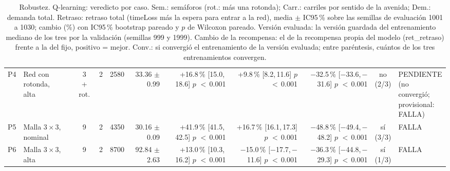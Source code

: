 \begin{table}[H]
\begin{tabular}{llcrrrrrrcl}
P4 & \makecell[l]{Red con\\{}rotonda,\\{}alta} & \makecell[c]{3\\{}+ rot.} & 2 & 2580 & \makecell[r]{33.36\\{}$\pm$ 0.99} & \makecell[r]{+16.8\,\%\\{}[15.0,\,18.6]\\$p$ $<$\,0.001} & \makecell[r]{+9.8\,\%\\{}[8.2,\,11.6]\\$p$ $<$\,0.001} & \makecell[r]{$-$32.5\,\%\\{}[$-$33.6,\,$-$31.6]\\$p$ $<$\,0.001} & \makecell[c]{no\\{}(2/3)} & \makecell[l]{PENDIENTE\\{}(no convergió;\\{}provisional:\\{}FALLA)} \\
P5 & \makecell[l]{Malla $3 \times 3$,\\{}nominal} & 9 & 2 & 4350 & \makecell[r]{30.16\\{}$\pm$ 0.09} & \makecell[r]{+41.9\,\%\\{}[41.5,\,42.5]\\$p$ $<$\,0.001} & \makecell[r]{+16.7\,\%\\{}[16.1,\,17.3]\\$p$ $<$\,0.001} & \makecell[r]{$-$48.8\,\%\\{}[$-$49.4,\,$-$48.2]\\$p$ $<$\,0.001} & \makecell[c]{sí\\{}(3/3)} & FALLA \\
P6 & \makecell[l]{Malla $3 \times 3$,\\{}alta} & 9 & 2 & 8700 & \makecell[r]{92.84\\{}$\pm$ 2.63} & \makecell[r]{+13.0\,\%\\{}[10.3,\,16.2]\\$p$ $<$\,0.001} & \makecell[r]{$-$15.0\,\%\\{}[$-$17.7,\,$-$11.6]\\$p$ $<$\,0.001} & \makecell[r]{$-$36.3\,\%\\{}[$-$44.8,\,$-$29.3]\\$p$ $<$\,0.001} & \makecell[c]{sí\\{}(1/3)} & FALLA \\
\bottomrule
\end{tabular}
\caption[Robustez: veredicto de Q-learning]{Robustez. Q-learning: veredicto por caso. Sem.: semáforos (rot.: más una rotonda); Carr.: carriles por sentido de la avenida; Dem.: demanda total. Retraso: retraso total (timeLoss más la espera para entrar a la red), media $\pm$ IC95\,\% sobre las semillas de evaluación 1001 a 1030; cambio (\%) con IC95\,\% bootstrap pareado y $p$ de Wilcoxon pareado. Versión evaluada: la versión guardada del entrenamiento mediano de los tres por la validación (semillas 999 y 1999). Cambio de la recompensa: el de la recompensa propia del modelo (ret\_retraso) frente a la del fijo, positivo = mejor. Conv.: si convergió el entrenamiento de la versión evaluada; entre paréntesis, cuántos de los tres entrenamientos convergen.}
\label{tab:robustez-veredicto-ql}
\end{table}
